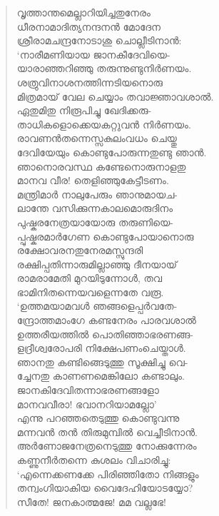 \begin{verse}
വൃത്താന്തമെല്ലാറിയിച്ചതുനേരം\\
ധീരനാമാദിത്യനന്ദനന്‍ മോദേന\\
ശ്രീരാമചന്ദ്രനോടാശു ചൊല്ലീടിനാന്‍:\\
‘നാരീമണിയായ ജാനകീദേവിയെ-\\
യാരാഞ്ഞറിഞ്ഞു തരുന്നുണ്ടുനിര്‍ണയം.\\
ശത്രുവിനാശനത്തിന്നടിയനൊരു\\
മിത്രമായ് വേല ചെയ്യാം തവാജ്ഞാവശാല്‍.\\
ഏതുമിതു നിരൂപിച്ചു ഖേദിക്കരു-\\
താധികളൊക്കെയകറ്റുവന്‍ നിര്‍ണയം.\\
രാവണന്‍തന്നെസ്സകുലംവധം ചെയ്തു\\
ദേവിയേയും കൊണ്ടുപോരുന്നതുണ്ടു ഞാന്‍.\\
ഞാനൊരവസ്ഥ കണ്ടേനൊരുനാളതു\\
മാനവ വീര! തെളിഞ്ഞുകേട്ടീടണം.\\
മന്ത്രിമാര്‍ നാലുപേരും ഞാനുമായച-\\
ലാന്തേ വസിക്കുന്നകാലമൊരുദിനം\\
പുഷ്കരനേത്രയായോരു തരുണിയെ-\\
പ്പുഷ്കരമാര്‍ഗേണ കൊണ്ടുപോയാനൊരു\\
രക്ഷോവരനതുനേരമസ്സുന്ദരി\\
രക്ഷിപ്പതിന്നാരുമില്ലാഞ്ഞു ദീനയായ്\\
രാമരാമേതി മുറയിടുന്നോള്‍, തവ\\
ഭാമിനിതന്നെയവളെന്നതേ വരൂ.\\
‘ഉത്തമയാമവള്‍ ഞങ്ങളെപ്പര്‍വതേ-\\
ന്ദ്രോത്തമാംഗേ കണ്ടനേരം പാരവശാല്‍\\
ഉത്തരീയത്തില്‍ പൊതിഞ്ഞാഭരണങ്ങ-\\
ളദ്രീശ്വരോപരി നിക്ഷേപണംചെയ്താള്‍.\\
ഞാനതു കണ്ടിങ്ങെടുത്തു സൂക്ഷിച്ചു വെ-\\
ച്ചേനതു കാണണമെങ്കിലോ കണ്ടാലും.\\
ജാനകിദേവിതന്നാഭരണങ്ങളോ\\
മാനവവീരാ! ഭവാനറിയാമല്ലോ’\\
എന്നു പറഞ്ഞതെടുത്തു കൊണ്ടുവന്നു\\
മന്നവന്‍ തന്‍ തിരുമുമ്പില്‍ വെച്ചീടിനാന്‍.\\
അര്‍ണോജനേത്രനെടുത്തു നോക്കുന്നേരം\\
കണ്ണുനീര്‍തന്നെ കുശലം വിചാരിച്ചു:\\
‘എന്നെക്കണക്കേ പിരിഞ്ഞിതോ നിങ്ങളും\\
തന്വംഗിയാകിയ വൈദേഹിയോടയ്യോ?\\
സീതേ! ജനകാത്മജേ! മമ വല്ലഭേ!\\

\end{verse}
